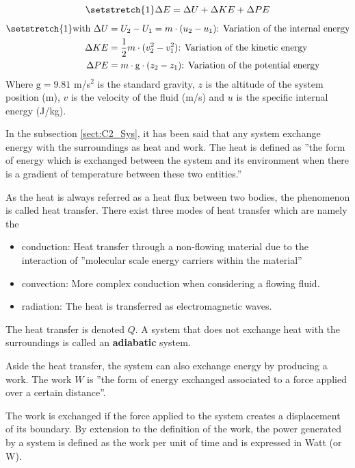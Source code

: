 \begin{equation}
\setstretch{1}
    \Delta E = \Delta U + \Delta KE + \Delta PE \label{eq:C2_E}
\end{equation}
\begin{align*}
\setstretch{1}
    \text{with } \Delta U  &= U_2 - U_1 =  m\cdot(u_2 - u_1) \text{: Variation of the internal energy}\\
                 \Delta KE &= \frac{1}{2}m\cdot(v^2_2 - v^2_1)\text{: Variation of the kinetic energy}\\
                 \Delta PE &= m\cdot \text{g}\cdot(z_2 - z_1)\text{: Variation of the potential energy}
\end{align*} 
Where $\text{g}=9.81$ m/s$^2$ is the standard gravity, $z$ is the altitude of the system position (m), $v$ is the velocity of the fluid (m/s) and $u$ is the specific internal energy (J/kg).


In the subsection \ref{sect:C2_Sys}, it has been said that any system exchange energy with the surroundings as heat and work. The heat is defined as ''the form of energy which is exchanged between the system and its environment when there is a gradient of temperature between these two entities.'' 

As the heat is always referred as a heat flux between two bodies, the phenomenon is called heat transfer. There exist three modes of heat transfer which are namely the

 
\begin{itemize}
    \item conduction: Heat transfer through a non-flowing material due to the interaction of ''molecular scale energy carriers within the material''\cite{GregoryNellis2015}
    \item convection: More complex conduction when considering a flowing fluid.
    \item radiation: The heat is transferred as electromagnetic waves.
\end{itemize}
The heat transfer is denoted $Q$. A system that does not exchange heat with the surroundings is called an \textbf{adiabatic} system.

Aside the heat transfer, the system can also exchange energy by producing a work. The work $W$ is ''the form of energy exchanged associated to a force applied over a certain distance''. 

The work is exchanged if the force applied to the system creates a displacement of its boundary. By extension to the definition of the work, the power generated by a system is defined as the work per unit of time and is expressed in Watt (or W).

